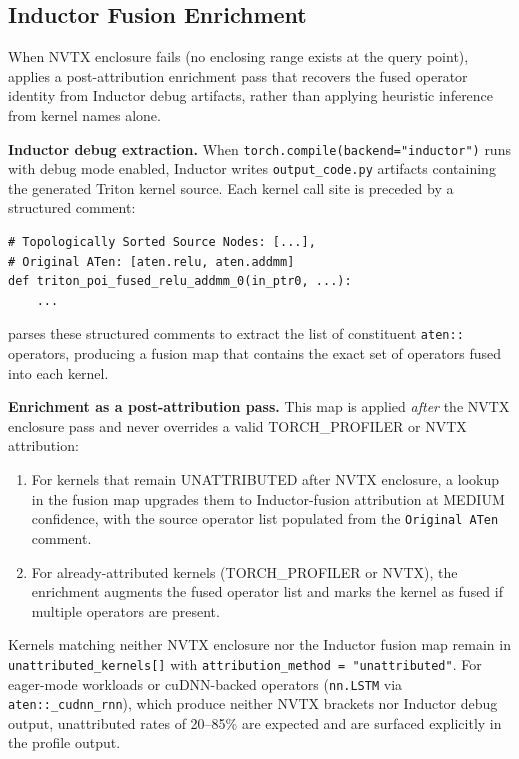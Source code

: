 \subsection{Inductor Fusion Enrichment}
\label{sec:heuristic}

When NVTX enclosure fails (no enclosing range exists at the query point), \sys applies a
post-attribution enrichment pass that recovers the fused operator identity from Inductor
debug artifacts, rather than applying heuristic inference from kernel names alone.

\textbf{Inductor debug extraction.}  When \texttt{torch.compile(\allowbreak backend="inductor")} runs with
debug mode enabled, Inductor writes \texttt{output\_code.py} artifacts containing the generated
Triton kernel source.  Each kernel call site is preceded by a structured comment:

\begin{lstlisting}[style=pystyle]
# Topologically Sorted Source Nodes: [...],
# Original ATen: [aten.relu, aten.addmm]
def triton_poi_fused_relu_addmm_0(in_ptr0, ...):
    ...
\end{lstlisting}

\sys parses these structured comments to extract the list of constituent \texttt{aten::} operators,
producing a fusion map that contains the exact set of operators fused into each kernel.

\textbf{Enrichment as a post-attribution pass.}  This map is applied \emph{after} the NVTX
enclosure pass and never overrides a valid TORCH\_PROFILER or NVTX attribution:
\begin{enumerate}[leftmargin=1.5em]
  \item For kernels that remain UNATTRIBUTED after NVTX enclosure, a lookup in the fusion map
    upgrades them to Inductor-fusion attribution at MEDIUM confidence, with the
    source operator list populated from the \texttt{Original~ATen} comment.
  \item For already-attributed kernels (TORCH\_PROFILER or NVTX), the enrichment augments the
    fused operator list and marks the kernel as fused if multiple operators are present.
\end{enumerate}

Kernels matching neither NVTX enclosure nor the Inductor fusion map remain in
\texttt{unattributed\_\allowbreak kernels[]} with \texttt{attribution\_method = "unattributed"}.  For eager-mode
workloads or cuDNN-backed operators (\eg \texttt{nn.LSTM} via \texttt{aten::\_cudnn\_rnn}), which
produce neither NVTX brackets nor Inductor debug output, unattributed rates of 20--85\% are expected
and are surfaced explicitly in the profile output.

